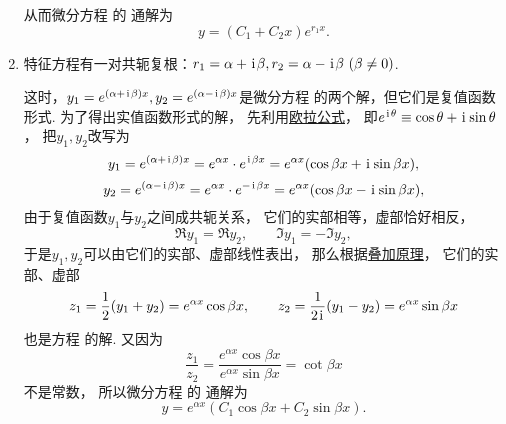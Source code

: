 \begin{enumerate}
	从而微分方程  的
	通解为\begin{equation}
		y = (C_1 + C_2 x) e^{r_1 x}.
	\end{equation}

	\item 特征方程有一对共轭复根：\(r_1 = \alpha+\kern1pt\mathrm{i}\kern1pt\beta, r_2 = \alpha-\kern1pt\mathrm{i}\kern1pt\beta \ (\beta\neq0)\).

	这时，\(y_1 = e^{(\alpha+\kern1pt\mathrm{i}\kern1pt\beta)x}, y_2 = e^{(\alpha-\kern1pt\mathrm{i}\kern1pt\beta)x}\)是微分方程  的两个解，但它们是复值函数形式.
	为了得出实值函数形式的解，
	先利用\hyperref[equation:复数.欧拉公式]{欧拉公式}，
	即\(e^{\kern1pt\mathrm{i}\kern1pt\theta} \equiv \cos\theta+\kern1pt\mathrm{i}\kern1pt\sin\theta\)，
	把\(y_1,y_2\)改写为\begin{equation*}
		y_1 = e^{(\alpha+\kern1pt\mathrm{i}\kern1pt\beta)x} = e^{\alpha x} \cdot e^{\kern1pt\mathrm{i}\kern1pt\beta x}
		= e^{\alpha x} (\cos\beta x + \kern1pt\mathrm{i}\kern1pt \sin\beta x),
	\end{equation*}\begin{equation*}
		y_2 = e^{(\alpha-\kern1pt\mathrm{i}\kern1pt\beta)x} = e^{\alpha x} \cdot e^{-\kern1pt\mathrm{i}\kern1pt\beta x}
		= e^{\alpha x} (\cos\beta x - \kern1pt\mathrm{i}\kern1pt \sin\beta x),
	\end{equation*}
	由于复值函数\(y_1\)与\(y_2\)之间成共轭关系，
	它们的实部相等，虚部恰好相反，\begin{equation*}
		\Re y_1 = \Re y_2, \qquad
		\Im y_1 = -\Im y_2,
	\end{equation*}
	于是\(y_1,y_2\)可以由它们的实部、虚部线性表出，
	那么根据\hyperref[theorem:微分方程.二阶非齐次线性微分方程的解的叠加原理]{叠加原理}，
	它们的实部、虚部\begin{equation*}
		z_1 = \frac{1}{2} (y_1 + y_2) = e^{\alpha x} \cos\beta x,
		\qquad
		z_2 = \frac{1}{2\kern1pt\mathrm{i}\kern1pt} (y_1 - y_2) = e^{\alpha x} \sin\beta x
	\end{equation*}也是方程  的解.
	又因为\begin{equation*}
		\frac{z_1}{z_2}
		= \frac{e^{\alpha x} \cos\beta x}{e^{\alpha x} \sin\beta x}
		= \cot\beta x
	\end{equation*}不是常数，
	所以微分方程  的
	通解为\begin{equation}
		y = e^{\alpha x} (C_1 \cos\beta x + C_2 \sin\beta x).
	\end{equation}
\end{enumerate}

